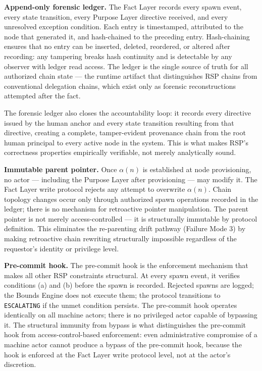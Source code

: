 \medskip
\noindent\textbf{Append-only forensic ledger.} The Fact Layer records every spawn event, every state transition, every Purpose Layer directive received, and every unresolved exception condition. Each entry is timestamped, attributed to the node that generated it, and hash-chained to the preceding entry. Hash-chaining ensures that no entry can be inserted, deleted, reordered, or altered after recording: any tampering breaks hash continuity and is detectable by any observer with ledger read access. The ledger is the single source of truth for all authorized chain state --- the runtime artifact that distinguishes RSP chains from conventional delegation chains, which exist only as forensic reconstructions attempted after the fact.

The forensic ledger also closes the accountability loop: it records every directive issued by the human anchor and every state transition resulting from that directive, creating a complete, tamper-evident provenance chain from the root human principal to every active node in the system. This is what makes RSP's correctness properties empirically verifiable, not merely analytically sound.

\medskip
\noindent\textbf{Immutable parent pointer.} Once $\alpha(n)$ is established at node provisioning, no actor --- including the Purpose Layer after provisioning --- may modify it. The Fact Layer write protocol rejects any attempt to overwrite $\alpha(n)$. Chain topology changes occur only through authorized spawn operations recorded in the ledger; there is no mechanism for retroactive pointer manipulation. The parent pointer is not merely access-controlled --- it is structurally immutable by protocol definition. This eliminates the re-parenting drift pathway (Failure Mode 3) by making retroactive chain rewriting structurally impossible regardless of the requestor's identity or privilege level.

\medskip
\noindent\textbf{Pre-commit hook.} The pre-commit hook is the enforcement mechanism that makes all other RSP constraints structural. At every spawn event, it verifies conditions (a) and (b) before the spawn is recorded. Rejected spawns are logged; the Bounds Engine does not execute them; the protocol transitions to \texttt{ESCALATING} if the unmet condition persists. The pre-commit hook operates identically on all machine actors; there is no privileged actor capable of bypassing it. The structural immunity from bypass is what distinguishes the pre-commit hook from access-control-based enforcement: even administrative compromise of a machine actor cannot produce a bypass of the pre-commit hook, because the hook is enforced at the Fact Layer write protocol level, not at the actor's discretion.


